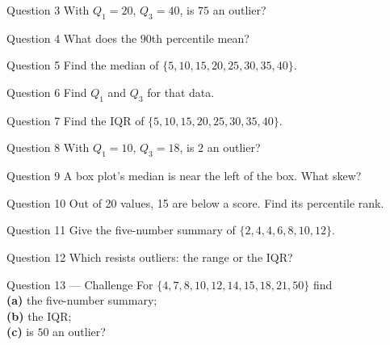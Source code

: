 \documentclass[11pt]{article}
\begin{document}
\begin{qbox}{Question 3}
With $Q_1=20$, $Q_3=40$, is $75$ an outlier?\workspace{2.4cm}
\end{qbox}

\begin{qbox}{Question 4}
What does the $90$th percentile mean?\workspace{2.4cm}
\end{qbox}

\begin{qbox}{Question 5}
Find the median of $\{5,10,15,20,25,30,35,40\}$.\workspace{2.4cm}
\end{qbox}

\begin{qbox}{Question 6}
Find $Q_1$ and $Q_3$ for that data.\workspace{2.4cm}
\end{qbox}

\begin{qbox}{Question 7}
Find the IQR of $\{5,10,15,20,25,30,35,40\}$.\workspace{2.4cm}
\end{qbox}

\begin{qbox}{Question 8}
With $Q_1=10$, $Q_3=18$, is $2$ an outlier?\workspace{2.4cm}
\end{qbox}

\begin{qbox}{Question 9}
A box plot's median is near the left of the box. What skew?\workspace{2.4cm}
\end{qbox}

\begin{qbox}{Question 10}
Out of 20 values, 15 are below a score. Find its percentile rank.\workspace{2.4cm}
\end{qbox}

\begin{qbox}{Question 11}
Give the five-number summary of $\{2,4,4,6,8,10,12\}$.\workspace{2.4cm}
\end{qbox}

\begin{qbox}{Question 12}
Which resists outliers: the range or the IQR?\workspace{2.4cm}
\end{qbox}

\begin{qbox}{Question 13 --- Challenge}
For $\{4,7,8,10,12,14,15,18,21,50\}$ find \\ \textbf{(a)} the five-number summary; \\ \textbf{(b)} the IQR; \\ \textbf{(c)} is $50$ an outlier?\workspace{3.2cm}
\end{qbox}
\end{document}
